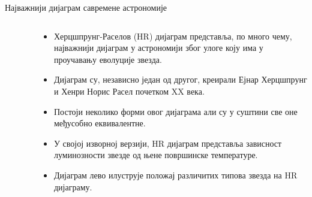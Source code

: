 \documentclass[aspectratio=169, xcolor=table, 10pt]{beamer}
\begin{document}
\begin{frame}{Најважнији дијаграм савремене астрономије}
  \begin{columns}[T]
    \begin{column}{0.45\textwidth}
      \begin{figure}
        \centering
        \vspace{-1em}
      \end{figure}
    \end{column}
    \begin{column}{0.55\textwidth}
      \begin{itemize}
        \item Херцшпрунг-Раселов (HR) дијаграм представља, по много чему, најважнији дијаграм у астрономији због улоге коју има у проучавању еволуције звезда.
        \item Дијаграм су, независно један од другог, креирали Ејнар Херцшпрунг и Хенри Норис Расел почетком XX века\cite{mathias}.
        \item Постоји неколико форми овог дијаграма али су у суштини све оне међусобно еквивалентне.
        \item У својој изворној верзији, HR дијаграм представља зависност луминозности звезде од њене површинске температуре.
        \item Дијаграм лево илуструје положај различитих типова звезда на HR дијаграму.
      \end{itemize}
    \end{column}
  \end{columns}
\end{frame}
\end{document}
